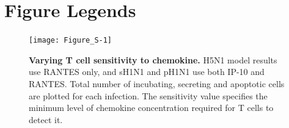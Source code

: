 \documentclass[10pt]{article}
\newcommand{\removed}[1]{{\color{dkred}\sout{#1}}}
\newcommand{\drew}[1]{{\color{dkgreen}#1}}
\newcommand{\fred}[1]{{\color{dkblue}#1}}
\begin{document}
%






\pagebreak

\section*{Figure Legends}



\setcounter{figure}{0}
\renewcommand{\thefigure}{S\arabic{figure}}


\begin{figure}[!ht]
\begin{center}
 \texttt{[image: Figure\_S-1]}
 \end{center}
\caption{{\bf Varying T cell sensitivity to chemokine.}  H5N1 model results use RANTES  only, and sH1N1 and pH1N1 use both IP-10 and RANTES. Total number of incubating, secreting and apoptotic cells are plotted for each infection.  The sensitivity value specifies the minimum level of chemokine concentration required for T cells to detect it. } 
 \label{fig:sensitivity}
\end{figure}
\end{document}
